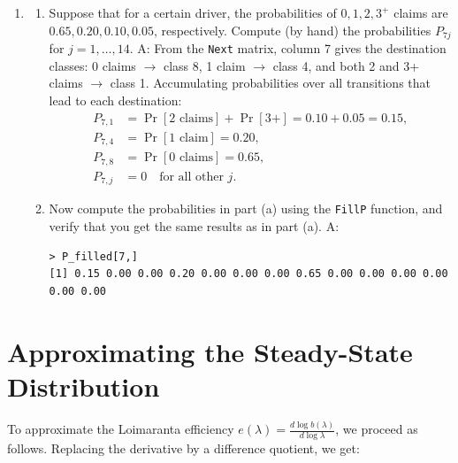 \documentclass{article}
\begin{document}
\begin{enumerate}
  \item [$\boldsymbol{Q}_1$]
  \begin{enumerate}
    \item [(a)] Suppose that for a certain driver, the probabilities of $0, 1, 2, 3^+$ claims are $0.65, 0.20, 0.10, 0.05$, respectively. Compute (by hand) the probabilities $P_{7j}$ for $j = 1, \ldots, 14$. \newline
    A: 
    From the \texttt{Next} matrix, column 7 gives the destination classes: 0 claims $\to$ class 8, 1 claim $\to$ class 4, and both 2 and 3+ claims $\to$ class 1. Accumulating probabilities over all transitions that lead to each destination:
    \begin{align*}
      P_{7,1} &= \Pr[\text{2 claims}] + \Pr[\text{3+}] = 0.10 + 0.05 = 0.15, \\
      P_{7,4} &= \Pr[\text{1 claim}] = 0.20, \\
      P_{7,8} &= \Pr[\text{0 claims}] = 0.65, \\
      P_{7,j} &= 0 \quad \text{for all other } j.
    \end{align*}
    \item [(b)] Now compute the probabilities in part (a) using the \lstinline[]|FillP| function, and verify that you get the same results as in part (a). \newline
    A:
\begin{lstlisting}
> P_filled[7,]
[1] 0.15 0.00 0.00 0.20 0.00 0.00 0.00 0.65 0.00 0.00 0.00 0.00 0.00 0.00
\end{lstlisting}
  \end{enumerate}
\end{enumerate}

\clearpage

\section{Approximating the Steady-State Distribution}
 
To approximate the Loimaranta efficiency $e(\lambda) = \frac{d \log b(\lambda)}{d \log \lambda}$, we proceed as follows. Replacing the derivative by a difference quotient, we get:
 
\end{document}
